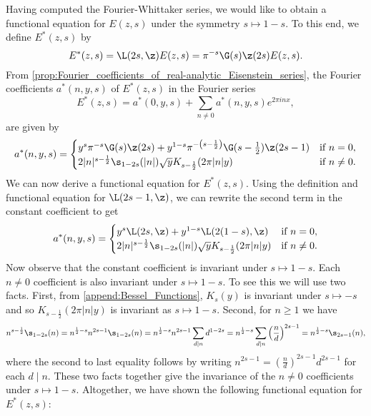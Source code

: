       Having computed the Fourier-Whittaker series, we would like to obtain a functional equation for $E(z,s)$ under the symmetry $s \mapsto 1-s$. To this end, we define $E^{\ast}(z,s)$ by
      \[
        E^{\ast}(z,s) = \L(2s,\z)E(z,s) = \pi^{-s}\G(s)\z(2s)E(z,s).
      \]
      From \cref{prop:Fourier_coefficients_of_real-analytic_Eisenstein_series}, the Fourier coefficients $a^{\ast}(n,y,s)$ of $E^{\ast}(z,s)$ in the Fourier series
      \[
        E^{\ast}(z,s) = a^{\ast}(0,y,s)+\sum_{n \neq 0}a^{\ast}(n,y,s)e^{2\pi inx},
      \]
       are given by
      \[
        a^{\ast}(n,y,s) = \begin{cases} y^{s}\pi^{-s}\G(s)\z(2s)+y^{1-s}\pi^{-\left(s-\frac{1}{2}\right)}\G(s-\frac{1}{2})\z(2s-1) & \text{if $n = 0$}, \\ 2|n|^{s-\frac{1}{2}}\s_{1-2s}(|n|)\sqrt{y}K_{s-\frac{1}{2}}(2\pi|n|y) & \text{if $n \neq 0$}. \end{cases}
      \]
      We can now derive a functional equation for $E^{\ast}(z,s)$. Using the definition and functional equation for $\L(2s-1,\z)$, we can rewrite the second term in the constant coefficient to get
      \begin{equation}\label{equ:Fourier_coefficients_for_completed_real-analytic_Eisenstein_series}
        a^{\ast}(n,y,s) = \begin{cases} y^{s}\L(2s,\z)+y^{1-s}\L(2(1-s),\z) & \text{if $n = 0$}, \\ 2|n|^{s-\frac{1}{2}}\s_{1-2s}(|n|)\sqrt{y}K_{s-\frac{1}{2}}(2\pi|n|y) & \text{if $n \neq 0$}. \end{cases}
      \end{equation}
      Now observe that the constant coefficient is invariant under $s \mapsto 1-s$. Each $n \neq 0$ coefficient is also invariant under $s \mapsto 1-s$. To see this we will use two facts. First, from \cref{append:Bessel_Functions}, $K_{s}(y)$ is invariant under $s \mapsto -s$ and so $K_{s-\frac{1}{2}}(2\pi|n|y)$ is invariant as $s \mapsto 1-s$. Second, for $n \ge 1$ we have
      \[
        n^{s-\frac{1}{2}}\s_{1-2s}(n) = n^{\frac{1}{2}-s}n^{2s-1}\s_{1-2s}(n) = n^{\frac{1}{2}-s}n^{2s-1}\sum_{d \mid n}d^{1-2s} = n^{\frac{1}{2}-s}\sum_{d \mid n}\left(\frac{n}{d}\right)^{2s-1} = n^{\frac{1}{2}-s}\s_{2s-1}(n),
      \]
      where the second to last equality follows by writing $n^{2s-1} = \left(\frac{n}{d}\right)^{2s-1}d^{2s-1}$ for each $d \mid n$. These two facts together give the invariance of the $n \neq 0$ coefficients under $s \mapsto 1-s$. Altogether, we have shown the following functional equation for $E^{\ast}(z,s)$:
